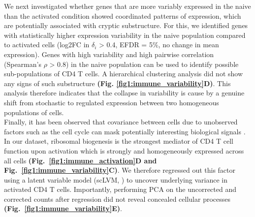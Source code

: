 We next investigated whether genes that are more variably expressed in the naive than the activated condition showed coordinated patterns of expression, which are potentially associated with cryptic substructure. For this, we identified genes with statistically higher expression variability in the naive population compared to activated cells (log2FC in $\delta_i$ > 0.4, EFDR = 5\%, no change in mean expression). Genes with high variability and high pairwise correlation (Spearman’s $\rho$ > 0.8) in the naive population can be used to identify possible sub-populations of CD4\plus{} T cells. A hierarchical clustering analysis did not show any signs of such substructure \textbf{(Fig. \ref{fig1:immune_variability}D)}. This analysis therefore indicates that the collapse in variability is cause by a genuine shift from stochastic to regulated expression between two homogeneous populations of cells.\\

Finally, it has been observed that covariance between cells due to unobserved factors such as the cell cycle can mask potentially interesting biological signals \citep{Stegle2015, Buettner2015}. In our dataset, ribosomal biogenesis is the strongest mediator of CD4\plus{} T cell function upon activation which is strongly and homogeneously expressed across all cells \textbf{(Fig.~\ref{fig1:immune_activation}D and Fig.~\ref{fig1:immune_variability}C)}. We therefore regressed out this factor using a latent variable model (scLVM, \citep{Buettner2015}) to uncover underlying variance in activated CD4\plus{} T cells. Importantly, performing PCA on the uncorrected and corrected counts after regression did not reveal concealed cellular processes \textbf{(Fig.~\ref{fig1:immune_variability}E)}.\\

\newpage


